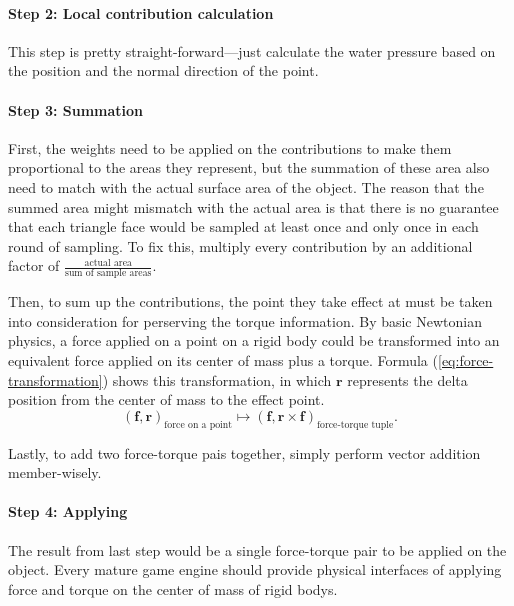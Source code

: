 \paragraph*{Step 2: Local contribution calculation}

This step is pretty straight-forward---just calculate the water pressure based on the position and the normal direction of the point.

\paragraph*{Step 3: Summation}

First, the weights need to be applied on the contributions to make them proportional to the areas they represent, but the summation of these area also need to match with the actual surface area of the object.
The reason that the summed area might mismatch with the actual area is that there is no guarantee that each triangle face would be sampled at least once and only once in each round of sampling.
To fix this, multiply every contribution by an additional factor of $\frac{\text{actual area}}{\text{sum of sample areas}}$.

Then, to sum up the contributions, the point they take effect at must be taken into consideration for perserving the torque information.
By basic Newtonian physics, a force applied on a point on a rigid body could be transformed into an equivalent force applied on its center of mass plus a torque.
Formula (\ref{eq:force-transformation}) shows this transformation, in which $\mathbf r$ represents the delta position from the center of mass to the effect point.
\begin{equation}
	(\mathbf f,\mathbf r)_{\text{force on a point}}\mapsto(\mathbf f,\mathbf r\times\mathbf f)_{\text{force-torque tuple}}.
	\label{eq:force-transformation}
\end{equation}

Lastly, to add two force-torque pais together, simply perform vector addition member-wisely.

\paragraph*{Step 4: Applying}

The result from last step would be a single force-torque pair to be applied on the object.
Every mature game engine should provide physical interfaces of applying force and torque on the center of mass of rigid bodys.
